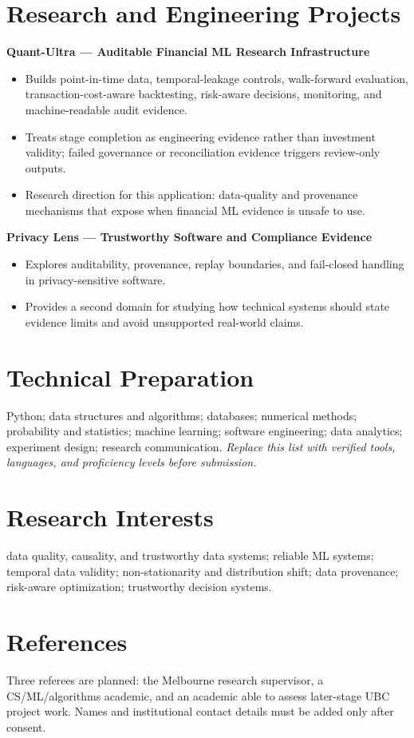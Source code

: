 \documentclass[11pt]{article}
\begin{document}
\section*{Research and Engineering Projects}
\textbf{Quant-Ultra --- Auditable Financial ML Research Infrastructure}
\begin{itemize}
\item Builds point-in-time data, temporal-leakage controls, walk-forward evaluation, transaction-cost-aware backtesting, risk-aware decisions, monitoring, and machine-readable audit evidence.
\item Treats stage completion as engineering evidence rather than investment validity; failed governance or reconciliation evidence triggers review-only outputs.
\item Research direction for this application: data-quality and provenance mechanisms that expose when financial ML evidence is unsafe to use.
\end{itemize}

\begin{samepage}
\textbf{Privacy Lens --- Trustworthy Software and Compliance Evidence}
\begin{itemize}
\item Explores auditability, provenance, replay boundaries, and fail-closed handling in privacy-sensitive software.
\item Provides a second domain for studying how technical systems should state evidence limits and avoid unsupported real-world claims.
\end{itemize}
\end{samepage}

\section*{Technical Preparation}
Python; data structures and algorithms; databases; numerical methods; probability and statistics; machine learning; software engineering; data analytics; experiment design; research communication. \textit{Replace this list with verified tools, languages, and proficiency levels before submission.}

\section*{Research Interests}
data quality, causality, and trustworthy data systems; reliable ML systems; temporal data validity; non-stationarity and distribution shift; data provenance; risk-aware optimization; trustworthy decision systems.

\section*{References}
Three referees are planned: the Melbourne research supervisor, a CS/ML/algorithms academic, and an academic able to assess later-stage UBC project work. Names and institutional contact details must be added only after consent.
\end{document}
